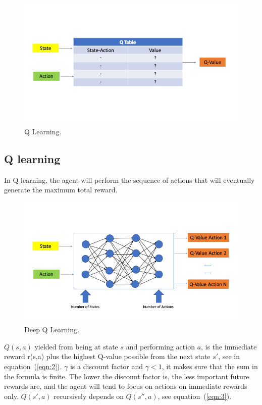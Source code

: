 \documentclass[conference]{IEEEtran}
\begin{document}
\begin{figure}[ht]
\includegraphics[width=\linewidth]{Q.png}
\caption{Q Learning.}
\label{fig7}
\end{figure}

\subsection{Q learning}\label{sub:Q}

In Q learning, the agent will perform the sequence of actions that will eventually generate the maximum total reward. 

\begin{figure}[ht]
\includegraphics[width=\linewidth]{DeepQ.png}
\caption{Deep Q Learning.}
\label{fig8}
\end{figure} 

$Q(s,a)$ yielded from being at state $s$ and performing action $a$, is the immediate reward r(s,a) plus the highest Q-value possible from the next state $s'$, see in equation~(\ref{eqn:2}). $\gamma$ is a discount factor and $\gamma < 1$, it makes sure that the sum in the formula is finite. The lower the discount factor is, the less important future rewards are, and the agent will tend to focus on actions on immediate rewards only. $Q(s',a)$ recursively depends on $Q(s{}'',a)$, see equation~(\ref{eqn:3}). 
\end{document}
